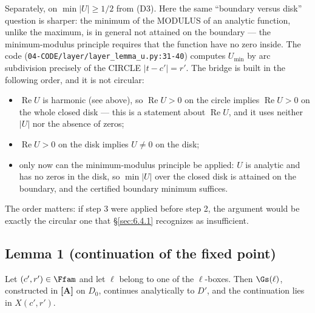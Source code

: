 Separately, on $\min |U| \ge 1/2$ from (D3). Here the same ``boundary
versus disk'' question is sharper: the minimum of the MODULUS of an
analytic function, unlike the maximum, is in general not attained on
the boundary --- the minimum-modulus principle requires that the
function have no zero inside. The code
(\texttt{04-\allowbreak CODE/\allowbreak layer/\allowbreak layer\_\allowbreak lemma\_\allowbreak u.py:31-40}) computes $U_{\min}$ by arc
subdivision precisely of the CIRCLE $|t-c'| = r'$. The bridge is
built in the following order, and it is not circular:

\begin{itemize}
\item[1.] $\operatorname{Re} U$ is harmonic (see above), so $\operatorname{Re} U > 0$ on the circle
   implies $\operatorname{Re} U > 0$ on the whole closed disk --- this is a statement
   about $\operatorname{Re} U$, and it uses neither $|U|$ nor the absence of zeros;
\item[2.] $\operatorname{Re} U > 0$ on the disk implies $U \ne 0$ on the disk;
\item[3.] only now can the minimum-modulus principle be applied: $U$ is
   analytic and has no zeros in the disk, so $\min |U|$ over the
   closed disk is attained on the boundary, and the certified
   boundary minimum suffices.
\end{itemize}

The order matters: if step 3 were applied before step 2, the argument
would be exactly the circular one that \S\ref{sec:6.4.1} recognizes as
insufficient.


\subsection{Lemma 1 (continuation of the fixed point)}
\label{sec:10.3}

\begin{lemmaone}
Let $(c',r') \in \Ffam$ and let $\ell$ belong to one of the
$\ell$-boxes. Then $\Gs(\ell)$, constructed in \textbf{[A]} on $D_0$, continues
analytically to $D'$, and the continuation lies in $X(c',r')$.
\end{lemmaone}

